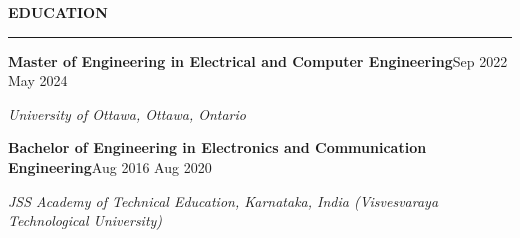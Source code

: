 \documentclass[11pt]{article}
\newcommand{\TwoColLine}[2]{\noindent #1\hfill #2\par}
\newcommand{\ResumeSection}[1]{\vspace{5pt}\begin{center}\textbf{\MakeUppercase{#1}}\\[-4pt]\rule{0.98\textwidth}{0.6pt}\end{center}\vspace{1pt}}
\newcommand{\OrgLine}[1]{\noindent\textit{#1}\par}
\begin{document}
\ResumeSection{Education}
\TwoColLine{\textbf{Master of Engineering in Electrical and Computer Engineering}}{Sep 2022 \textendash{} May 2024}
\OrgLine{University of Ottawa, Ottawa, Ontario}
\TwoColLine{\textbf{Bachelor of Engineering in Electronics and Communication Engineering}}{Aug 2016 \textendash{} Aug 2020}
\OrgLine{JSS Academy of Technical Education, Karnataka, India \quad (Visvesvaraya Technological University)}
\end{document}
